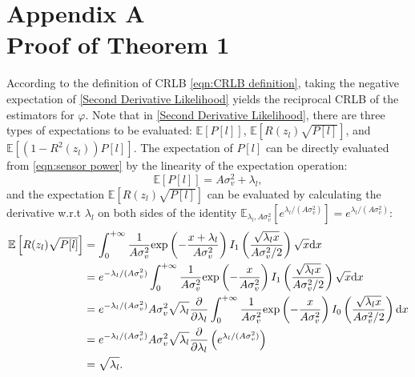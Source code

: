 \documentclass[12pt,draftclsnofoot,journal,onecolumn]{IEEEtran}
\theoremstyle{nonumberplain}
\def \exp {\text{exp}}
\begin{document}
\section*{Appendix A\\ Proof of Theorem 1}\label{appendix:proof of theorem1}
    According to the definition of CRLB \eqref{eqn:CRLB definition}, taking the negative expectation of \eqref{Second Derivative Likelihood} yields the reciprocal CRLB of the estimators for $\varphi$. Note that in \eqref{Second Derivative Likelihood}, there are three types of expectations to be evaluated: $\mathbb{E}\left[P[l]\right]$, $\mathbb{E}\left[R(z_l)\sqrt{P[l]}\right]$, and $\mathbb{E}\left[(1-R^2(z_l))P[l]\right]$. The expectation of $P[l]$ can be directly evaluated from \eqref{eqn:sensor power} by the linearity of the expectation operation:
    \begin{equation}
        \mathbb{E}\left[P[l]\right] = A\sigma_v^2 + \lambda_l,
        \label{eqn:expectation of P_l}
    \end{equation}
    and the expectation $\mathbb{E}\left[R(z_l) \sqrt{P[l]}\right]$ can be evaluated by calculating the derivative w.r.t $\lambda_l$ on both sides of the identity $\mathbb{E}_{\lambda_l, A\sigma_v^2}[e^{\lambda_l/(A\sigma_v^2)}]=e^{\lambda_l/(A\sigma_v^2)}$:
    \begin{equation}
        \begin{aligned}
            \mathbb{E}\left[R(z_l) \sqrt{P[l]}\right] & = \int_{0}^{+\infty}{\frac{1}{A\sigma_v^2}\exp\left(-\frac{x+\lambda_l}{A\sigma_v^2}\right)I_1\left(\frac{\sqrt{\lambda_l x}}{A\sigma_v^2/2}\right)\sqrt{x}{\rm d}x}\\
            & = e^{-\lambda_l/(A\sigma_v^2)}\int_{0}^{+\infty}{\frac{1}{A\sigma_v^2}\exp\left(-\frac{x}{A\sigma_v^2}\right)I_1\left(\frac{\sqrt{\lambda_l x}}{A\sigma_v^2/2}\right)\sqrt{x}{\rm d}x} \\
            & = e^{-\lambda_l/(A\sigma_v^2)} A\sigma_v^2 \sqrt{\lambda_l} \frac{\partial}{\partial\lambda_l} \int_{0}^{+\infty}{\frac{1}{A\sigma_v^2}\exp\left(-\frac{x}{A\sigma_v^2}\right)I_0\left(\frac{\sqrt{\lambda_l x}}{A\sigma_v^2/2}\right) {\rm d}x}\\
            & = e^{-\lambda_l/(A\sigma_v^2)} A\sigma_v^2 \sqrt{\lambda_l} \frac{\partial}{\partial\lambda_l} \left(e^{\lambda_l/(A\sigma_v^2)}\right)\\
            & = \sqrt{\lambda_l}.\\
        \end{aligned}
        \label{eqn:expectation_second_kind_1}
    \end{equation}
\end{document}
